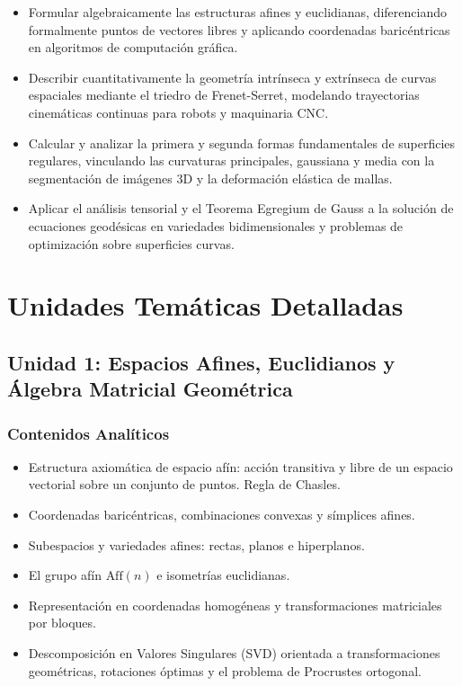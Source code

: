 \documentclass[11pt, a4paper]{article}
\begin{document}
	\begin{itemize}
		\item Formular algebraicamente las estructuras afines y euclidianas, diferenciando formalmente puntos de vectores libres y aplicando coordenadas baricéntricas en algoritmos de computación gráfica.
		\item Describir cuantitativamente la geometría intrínseca y extrínseca de curvas espaciales mediante el triedro de Frenet-Serret, modelando trayectorias cinemáticas continuas para robots y maquinaria CNC.
		\item Calcular y analizar la primera y segunda formas fundamentales de superficies regulares, vinculando las curvaturas principales, gaussiana y media con la segmentación de imágenes 3D y la deformación elástica de mallas.
		\item Aplicar el análisis tensorial y el Teorema Egregium de Gauss a la solución de ecuaciones geodésicas en variedades bidimensionales y problemas de optimización sobre superficies curvas.
	\end{itemize}
	
	\section{Unidades Temáticas Detalladas}
	
	\subsection{Unidad 1: Espacios Afines, Euclidianos y Álgebra Matricial Geométrica}
	
	\subsubsection*{Contenidos Analíticos}
	\begin{itemize}
		\item Estructura axiomática de espacio afín: acción transitiva y libre de un espacio vectorial sobre un conjunto de puntos. Regla de Chasles.
		\item Coordenadas baricéntricas, combinaciones convexas y símplices afines.
		\item Subespacios y variedades afines: rectas, planos e hiperplanos.
		\item El grupo afín $\text{Aff}(n)$ e isometrías euclidianas.
		\item Representación en coordenadas homogéneas y transformaciones matriciales por bloques.
		\item Descomposición en Valores Singulares (SVD) orientada a transformaciones geométricas, rotaciones óptimas y el problema de Procrustes ortogonal.
	\end{itemize}
	
\end{document}
